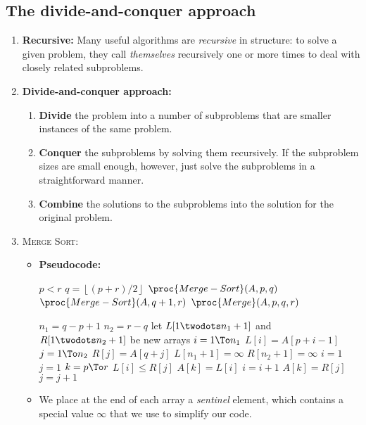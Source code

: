 \documentclass{report}
\newcommand{\floor}[1]{\left\lfloor #1 \right\rfloor}
\begin{document}
\subsection{The divide-and-conquer approach}
\begin{enumerate}
    \item \textbf{Recursive:} Many useful algorithms are \emph{recursive} in structure: to solve a given problem, they call \emph{themselves} recursively one or more times to deal with closely related subproblems.
    \item \textbf{Divide-and-conquer approach:}
    \begin{enumerate}
        \item \textbf{Divide} the problem into a number of subproblems that are smaller instances of the same problem.
        \item \textbf{Conquer} the subproblems by solving them recursively. If the subproblem sizes are small enough, however, just solve the subproblems in a straightforward manner.
        \item \textbf{Combine} the solutions to the subproblems into the solution for the original problem.
    \end{enumerate}
    \item \textsc{Merge Sort:}
    \begin{itemize}
        \item \textbf{Pseudocode:} 
        \begin{codebox}
        \li \If $p < r$
            \Then 
        \li     $q = \floor{(p+r)/2}$
        \li     $\proc{Merge-Sort}(A,p,q)$
        \li     $\proc{Merge-Sort}(A,q+1,r)$
        \li     $\proc{Merge}(A,p,q,r)$
            \End
        \end{codebox}
        \begin{codebox}
        \li $n_1 = q-p+1$
        \li $n_2 = r-q$
        \li let $L[1 \twodots n_1 + 1]$ and $R[1 \twodots n_2 + 1]$ be new arrays 
        \li \For $i = 1 \To n_1$
            \Do 
        \li     $L[i] = A[p+i-1]$
            \End 
        \li \For $j = 1 \To n_2$ 
            \Do 
        \li     $R[j] = A[q+j]$
            \End 
        \li $L[n_1 + 1] = \infty$ 
        \li $R[n_2 + 1] = \infty$
        \li $i = 1$
        \li $j = 1$
        \li \For $k = p \To r$
            \Do
        \li     \If $L[i] \leq R[j]$
                \Then 
        \li         $A[k] = L[i]$
        \li         $i = i+1$
        \li     \Else $A[k] = R[j]$
        \li         $j = j+1$
                \End
            \End
        \end{codebox}
        \item We place at the end of each array a \emph{sentinel} element, which contains a special value $\infty$ that we use to simplify our code.
    \end{itemize}
\end{enumerate}
\end{document}
